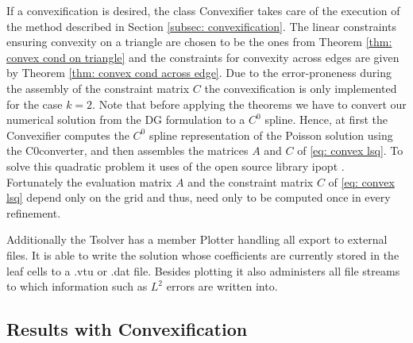 If a convexification is desired, the class Convexifier takes care of the execution of the method described in Section \ref{subsec: convexification}. The linear constraints ensuring convexity on a triangle are chosen to be the ones from Theorem \ref{thm: convex cond on triangle} and the constraints for convexity across edges are given by Theorem \ref{thm: convex cond across edge}. Due to the error-proneness during the assembly of the constraint matrix $C$ the convexification is only implemented for the case $k=2$.
Note that before applying the theorems we have to convert our numerical solution from the DG formulation to a $C^0$ spline.
Hence, at first the Convexifier computes the $C^0$ spline representation of the Poisson solution using the C0converter, and then assembles the matrices $A$ and $C$ of \eqref{eq: convex lsq}. To solve this quadratic problem it uses of the open source library ipopt \cite{ipopt}.\\
Fortunately the evaluation matrix $A$ and the constraint matrix $C$ of \eqref{eq: convex lsq} depend only on the grid and thus, need only to be computed once in every refinement.

Additionally the Tsolver has a member Plotter handling all export to external files. It is able to write the solution whose coefficients are currently stored in the leaf cells to a .vtu or .dat file. Besides plotting it also administers all file streams to which information such as $L^2$ errors are written into.

\subsection{Results with Convexification}

